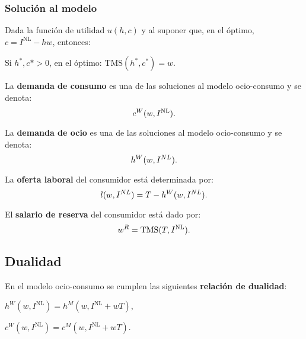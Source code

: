 \documentclass[8pt,a4paper]{extarticle}
\begin{document}
\begin{multicols}{3}
\subsubsection*{Solución al modelo}

Dada la función de utilidad $u (h, c)$ y al suponer que, en el óptimo, $c = I^{\text{NL}} - hw$, entonces:

\begin{bulletlist}
\item Si $h^*, c* > 0$, en el óptimo: $\text{TMS} (h^*, c^*) = w$.
\end{bulletlist}

\begin{boxdef}
	La \textbf{demanda de consumo} es una de las soluciones al modelo ocio-consumo y se denota:
	\[
		c^W(w, I^{\text{\normalfont NL}})
	.\] 
\end{boxdef}

\begin{boxdef}
	La \textbf{demanda de ocio} es una de las soluciones al modelo ocio-consumo y se denota:
	\[
		h^W(w, I^{\normalfont NL})
	.\] 
\end{boxdef}

\begin{boxdef}
	La \textbf{oferta laboral} del consumidor está determinada por:
	\[
		l(w, I^{\normalfont NL}) = T - h^W(w, I^{\normalfont NL})
	.\] 
\end{boxdef}

\begin{boxdef}
	El \textbf{salario de reserva} del consumidor está dado por:
	\[
		w^R = \text{\normalfont TMS} (T, I^{\text{\normalfont NL}})
	.\] 
\end{boxdef}

\sectionbreak

\subsection{Dualidad}

En el modelo ocio-consumo se cumplen las siguientes \textbf{relación de dualidad}:

\begin{eqlist}
\item $h^W(w, I^{\text{NL}}) = h^M (w, I^{\text{NL}} + wT)$,
\item $c^W(w, I^{\text{NL}}) = c^M (w, I^{\text{NL}} + wT)$.
\end{eqlist}


\end{multicols}
\end{document}
